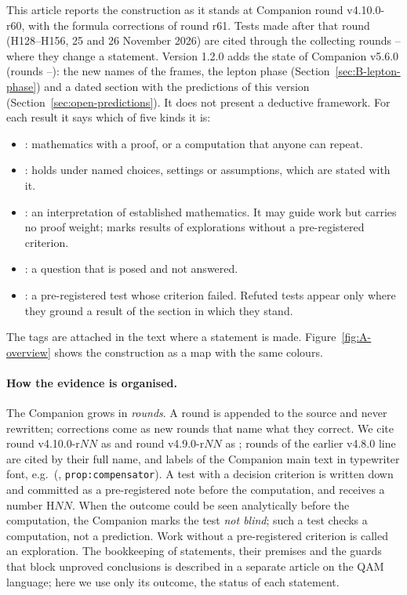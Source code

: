 This article reports the construction as it stands at Companion round v4.10.0-r60, with the formula corrections of round r61.
Tests made after that round (H128--H156, 25 and 26 November 2026) are cited through the collecting rounds -- where they
change a statement. Version 1.2.0 adds the state of Companion v5.6.0 (rounds --): the new names of the frames, the
lepton phase (Section~\ref{sec:B-lepton-phase}) and a dated section with the predictions of this version
(Section~\ref{sec:open-predictions}). It does not present a deductive framework. For each result it says which of five kinds it is:
\begin{itemize}
\item \Established: mathematics with a proof, or a computation that anyone can repeat.
\item \Conditional: holds under named choices, settings or assumptions, which are stated with it.
\item \Reading: an interpretation of established mathematics. It may guide work but carries no proof
  weight; \Exploration{} marks results of explorations without a pre-registered criterion.
\item \Open: a question that is posed and not answered.
\item \Refuted: a pre-registered test whose criterion failed. Refuted tests appear only where they ground
  a result of the section in which they stand.
\end{itemize}
The tags are attached in the text where a statement is made. Figure~\ref{fig:A-overview} shows the
construction as a map with the same colours.

\paragraph{How the evidence is organised.}
The Companion grows in \emph{rounds}. A round is appended to the source and never rewritten;
corrections come as new rounds that name what they correct. We cite round v4.10.0-r$NN$ as
 and round v4.9.0-r$NN$ as ; rounds of the earlier v4.8.0 line are cited
by their full name, and labels of the Companion main text in typewriter font, e.g.\
(\cite{QSC}, \texttt{prop:compensator}). A test with a decision criterion is written down and committed
as a pre-registered note before the computation, and receives a number H$NN$. When the outcome could
be seen analytically before the computation, the Companion marks the test \emph{not blind}; such a test
checks a computation, not a prediction. Work without a pre-registered criterion is called an
exploration. The bookkeeping of statements, their premises and the guards that block unproved
conclusions is described in a separate article on the QAM language; here we use only its outcome, the
status of each statement.

